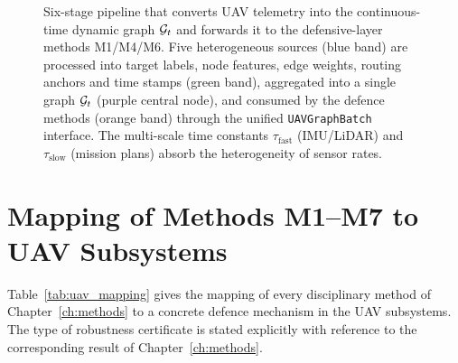 \begin{figure}[htbp]
\caption{Six-stage pipeline that converts UAV telemetry into the
continuous-time dynamic graph $\mathcal{G}_t$ and forwards it to the
defensive-layer methods \textsf{M1}/\textsf{M4}/\textsf{M6}. Five
heterogeneous sources (blue band) are processed into target labels,
node features, edge weights, routing anchors and time stamps (green
band), aggregated into a single graph $\mathcal{G}_t$ (purple central
node), and consumed by the defence methods (orange band) through
the unified \texttt{UAVGraphBatch} interface. The multi-scale time
constants $\tau_{\mathrm{fast}}$ (IMU/LiDAR) and
$\tau_{\mathrm{slow}}$ (mission plans) absorb the heterogeneity of
sensor rates.}
\label{fig:uav_telemetry_pipeline}
\end{figure}

\section{Mapping of Methods \textsf{M1}--\textsf{M7} to UAV Subsystems}
\label{sec:uav_mapping}

Table~\ref{tab:uav_mapping} gives the mapping of every disciplinary
method of Chapter~\ref{ch:methods} to a concrete defence mechanism in
the UAV subsystems. The type of robustness certificate is stated
explicitly with reference to the corresponding result of
Chapter~\ref{ch:methods}.

